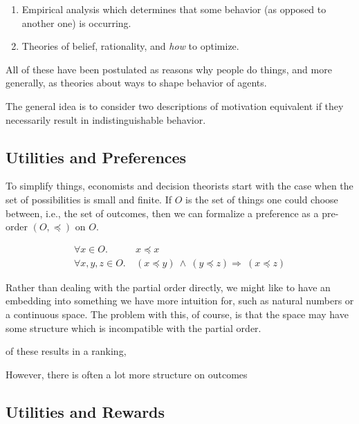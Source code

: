 \documentclass{book}
\begin{document}
	\begin{enumerate}
		\item Empirical analysis which determines that some behavior (as opposed to another one) is occurring. 
		\item Theories of belief, rationality, and \emph{how} to optimize.
	\end{enumerate}
	
	
	
	All of these have been postulated as reasons why people do things, and more generally, as theories about ways to shape behavior of agents. 
	
	
	
	The general idea is to consider two descriptions of motivation equivalent if they necessarily result in indistinguishable behavior. 
	
	
	\subsection{Utilities and Preferences}
	
	To simplify things, economists and decision theorists start with the case when the set of possibilities is small and finite. If $O$ is the set of things one could choose between, i.e., the set of outcomes, then we can formalize a preference as a pre-order $(O, \preccurlyeq)$ on $O$.
	
	\begin{align*}
		\forall x \in O.&~x \preccurlyeq x \tag{Reflexivity}\\
		\forall x,y,z \in O.&~(x\preccurlyeq y)~\land~( y \preccurlyeq z) \Rightarrow~(x \preccurlyeq z) \tag{Transitivity}
	\end{align*}
	
	Rather than dealing with the partial order directly, we might like to have an embedding into something we have more intuition for, such as natural numbers or a continuous space. The problem with this, of course, is that the space may have some structure which is incompatible with the partial order. 
	
	of these results in a ranking, 
	
	However, there is often a lot more structure on outcomes
	
	
	

	
	\subsection{Utilities and Rewards}
	
\end{document}
